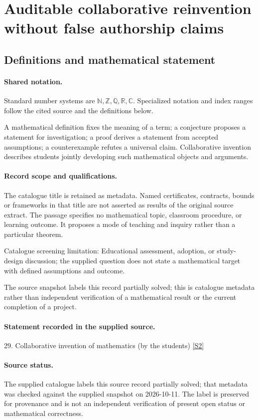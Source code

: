 \documentclass[11pt]{article}
\newcommand{\sref}[2]{\hyperlink{source:#1:#2}{[S#2]}}
\begin{document}
\section{Auditable collaborative reinvention without false authorship claims}\label{statement}

\subsection{Definitions and mathematical statement}

\paragraph{Shared notation.}Standard number systems are $\mathbb N,\mathbb Z,\mathbb Q,\mathbb R,\mathbb C$. Specialized notation and index ranges follow the cited source and the definitions below.


A mathematical definition fixes the meaning of a term; a conjecture proposes a statement for investigation; a proof derives a statement from accepted assumptions; a counterexample refutes a universal claim. Collaborative invention describes students jointly developing such mathematical objects and arguments.
\paragraph{Record scope and qualifications.}
The catalogue title is retained as metadata. Named certificates, contracts, bounds or frameworks in that title are not asserted as results of the original source extract.
The passage specifies no mathematical topic, classroom procedure, or learning outcome. It proposes a mode of teaching and inquiry rather than a particular theorem.

Catalogue screening limitation: Educational assessment, adoption, or study-design discussion; the supplied question does not state a mathematical target with defined assumptions and outcome.

The source snapshot labels this record partially solved; this is catalogue metadata rather than independent verification of a mathematical result or the current completion of a project.
\paragraph{Statement recorded in the supplied source.}
29. Collaborative invention of mathematics (by the students) \sref{statement}{2}
\paragraph{Source status.}
The supplied catalogue labels this source record partially solved; that metadata was checked against the supplied snapshot on 2026-10-11. The label is preserved for provenance and is not an independent verification of present open status or mathematical correctness.
\end{document}
